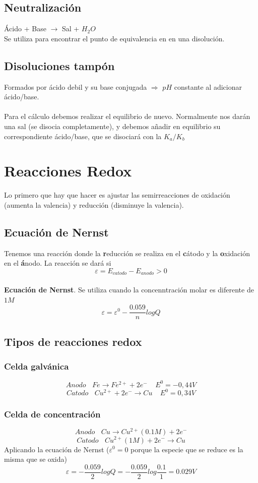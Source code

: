 \documentclass[12pt]{article}
\begin{document}
	\subsection{Neutralización}
	Ácido + Base $\longrightarrow$ Sal + $H_2O$ \\
	Se utiliza para encontrar el punto de equivalencia en en una disolución.		
	
	\subsection{Disoluciones tampón}
	Formados por ácido debil y su base conjugada $\Rightarrow$ $pH$ constante al adicionar ácido/base.\\
	\\
	Para el cálculo debemos realizar el equilibrio de nuevo. Normalmente nos darán una sal (se disocia completamente), y debemos añadir en equilibrio su correspondiente ácido/base, que se disociará con la $K_a/K_b$	
	\section{Reacciones Redox}
	Lo primero que hay que hacer es ajustar las semirreacciones de oxidación (aumenta la valencia) y reducción (disminuye la valencia).
	
	\subsection{Ecuación de Nernst}
	Tenemos una reacción donde la \textbf{r}educción se realiza en el \textbf{c}átodo y la \textbf{o}xidación en el \textbf{á}nodo. La reacción se dará si
	\[\varepsilon=E_{catodo}-E_{anodo}>0\]
	\\
	\textbf{Ecuación de Nernst}. Se utiliza cuando la concenntración molar es diferente de $1M$\\
	\[\varepsilon=\varepsilon^0 - \frac{0.059}{n}logQ\]
	
	\subsection{Tipos de reacciones redox}
	\subsubsection{Celda galvánica}
	\[Anodo \ \ \ \ Fe \longrightarrow Fe^{2+} + 2e^- \ \ \ \ \ E^0 = -0,44V\]
	\[Catodo \ \ \ \ Cu^{2+} + 2e^- \longrightarrow Cu \ \ \ \ \ E^0 = 0,34V \]
	
	\subsubsection{Celda de concentración}
	\[Anodo \ \ \ \ Cu \longrightarrow Cu^{2+}(0.1M) + 2e^- \]
	\[Catodo \ \ \ \ Cu^{2+}(1M) + 2e^- \longrightarrow Cu \]
	Aplicando la ecuación de Nernst ($\varepsilon^0= 0$ porque la especie que se reduce es la misma que se oxida)
	\[\varepsilon = -\frac{0.059}{2}logQ=-\frac{0.059}{2}log\frac{0.1}{1}=0.029V\]
	
\end{document}
